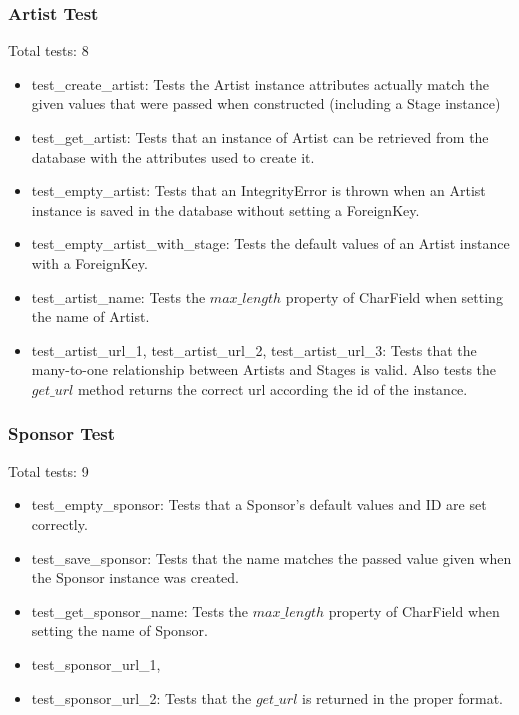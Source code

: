 \documentclass[12pt,english]{scrartcl}
\begin{document}
\subsubsection{Artist Test}
Total tests: 8
\begin{itemize}
\item test\_create\_artist: Tests the Artist instance attributes actually match the given values
that were passed when constructed (including a Stage instance)
 
\item test\_get\_artist: Tests that an instance of Artist can be retrieved from the database with the attributes used to create it.
 
\item test\_empty\_artist: Tests that an IntegrityError is thrown when an Artist instance is saved in the database without setting a ForeignKey.
 
\item test\_empty\_artist\_with\_stage: Tests the default values of an Artist instance with a ForeignKey.
 
\item test\_artist\_name: Tests the $max\_length$ property of CharField when setting the name of Artist.
 
\item test\_artist\_url\_1, test\_artist\_url\_2, test\_artist\_url\_3: Tests that the many-to-one relationship between
Artists and Stages is valid. Also tests the $get\_url$ method returns the correct url according the id of the instance.
\end{itemize} 

\subsubsection{Sponsor Test} 
Total tests: 9

\begin{itemize}
\item test\_empty\_sponsor: Tests that a Sponsor's default values and ID are set correctly.
 
\item test\_save\_sponsor: Tests that the name matches the passed value given when the Sponsor instance was created.  
 
\item test\_get\_sponsor\_name: Tests the $max\_length$ property of CharField when setting the name of Sponsor.

\item test\_sponsor\_url\_1, \item test\_sponsor\_url\_2: Tests that the $get\_url$ is returned in the proper format.
\end{itemize}
\end{document}
